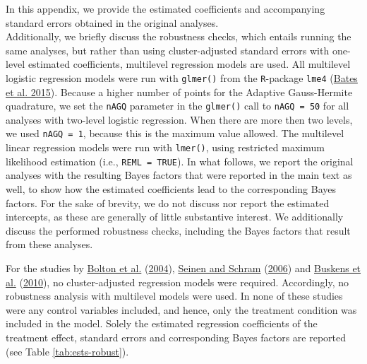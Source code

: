 \documentclass[
  11pt,
]{article}
\begin{document}
In this appendix, we provide the estimated coefficients and accompanying standard errors obtained in the original analyses.\\
Additionally, we briefly discuss the robustness checks, which entails running the same analyses, but rather than using cluster-adjusted standard errors with one-level estimated coefficients, multilevel regression models are used.
All multilevel logistic regression models were run with \texttt{glmer()} from the \texttt{R}-package \texttt{lme4} (\protect\hyperlink{ref-lme4}{Bates et al. 2015}).
Because a higher number of points for the Adaptive Gauss-Hermite quadrature, we set the \texttt{nAGQ} parameter in the \texttt{glmer()} call to \texttt{nAGQ\ =\ 50} for all analyses with two-level logistic regression.
When there are more then two levels, we used \texttt{nAGQ\ =\ 1}, because this is the maximum value allowed.
The multilevel linear regression models were run with \texttt{lmer()}, using restricted maximum likelihood estimation (i.e., \texttt{REML\ =\ TRUE}).
In what follows, we report the original analyses with the resulting Bayes factors that were reported in the main text as well, to show how the estimated coefficients lead to the corresponding Bayes factors.
For the sake of brevity, we do not discuss nor report the estimated intercepts, as these are generally of little substantive interest.
We additionally discuss the performed robustness checks, including the Bayes factors that result from these analyses.

For the studies by \protect\hyperlink{ref-bolton_electronic_2004}{Bolton et al.} (\protect\hyperlink{ref-bolton_electronic_2004}{2004}), \protect\hyperlink{ref-seinen_schram_social_2006}{Seinen and Schram} (\protect\hyperlink{ref-seinen_schram_social_2006}{2006}) and \protect\hyperlink{ref-buskens_raub_veer_triads_2010}{Buskens et al.} (\protect\hyperlink{ref-buskens_raub_veer_triads_2010}{2010}), no cluster-adjusted regression models were required.
Accordingly, no robustness analysis with multilevel models were used.
In none of these studies were any control variables included, and hence, only the treatment condition was included in the model.
Solely the estimated regression coefficients of the treatment effect, standard errors and corresponding Bayes factors are reported (see Table \ref{tab:ests-robust}).
\end{document}
